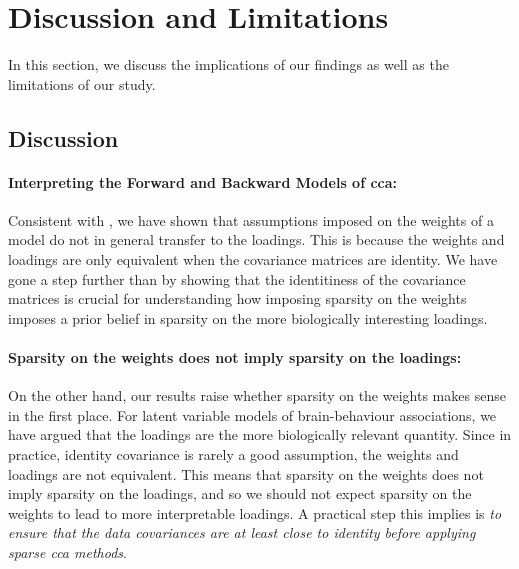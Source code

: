 \newpage


\section{Discussion and Limitations}

In this section, we discuss the implications of our findings as well as the limitations of our study.

\subsection{Discussion}

\paragraph{Interpreting the Forward and Backward Models of \acrshort{cca}:} Consistent with \cite{haufe2014interpretation}, we have shown that assumptions imposed on the \gls{weights} of a model do not in general transfer to the loadings.
This is because the \gls{weights} and \gls{loadings} are only equivalent when the covariance matrices are identity.
We have gone a step further than \cite{haufe2014interpretation} by showing that the identitiness of the covariance matrices is crucial for understanding how imposing sparsity on the \gls{weights} imposes a prior belief in sparsity on the more biologically interesting loadings.

\paragraph{Sparsity on the \gls{weights} does not imply sparsity on the loadings:}

On the other hand, our results raise whether sparsity on the \gls{weights} makes sense in the first place.
For latent variable models of brain-behaviour associations, we have argued that the \gls{loadings} are the more biologically relevant quantity.
Since in practice, identity covariance is rarely a good assumption, the \gls{weights} and \gls{loadings} are not equivalent.
This means that sparsity on the \gls{weights} does not imply sparsity on the loadings, and so we should not expect sparsity on the \gls{weights} to lead to more interpretable loadings.
A practical step this implies is \textit{to ensure that the data covariances are at least close to identity before applying sparse \acrshort{cca} methods}.

